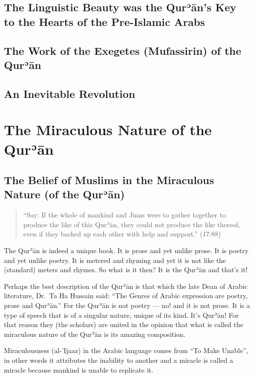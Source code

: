 \documentclass[12pt]{book}
\def \Quran{Qurʾān} %
\def \Qrn{\Quran}   %
\begin{document}
\section{The Linguistic Beauty was the \Quran’s Key
to the Hearts of the Pre-Islamic Arabs}

\section[The Work of the Exegetes of the \Quran]
{The Work of the Exegetes (Mufassirin) of the \Quran}

\section{An Inevitable Revolution}


\chapter{The Miraculous Nature of the \Quran}

\section{The Belief of Muslims in the Miraculous Nature (of the \Quran)}

\begin{quote}
“Say: If the whole of mankind and Jinns were to gather together to produce the
like of this \Quran, they could not produce the like thereof, even if they
backed up each other with help and support.” (17:88)
\end{quote}

The \Qrn{} is indeed a unique book. It is prose and yet unlike prose. It is
poetry and yet unlike poetry. It is metered and rhyming and yet it is not like
the (standard) meters and rhymes. So what is it then? It is the \Qrn{} and
that’s it!

Perhaps the best description of the \Qrn{} is that which the late Dean of
Arabic literature, Dr.\ Ta Ha Hussain said: “The Genres of Arabic expression
are poetry, prose and \Quran.” For the \Qrn{} is not poetry — no! and it is not
prose. It is a type of speech that is of a singular nature, unique of its kind.
It’s \Quran! For that reason they (the scholars) are united in the opinion that
what is called the miraculous nature of the \Qrn{} is its amazing composition.

Miraculousness (al-’Ijaaz) in the Arabic language comes from “To Make Unable”,
in other words it attributes the inability to another and a miracle is called a
miracle because mankind is unable to replicate it.
\end{document}
